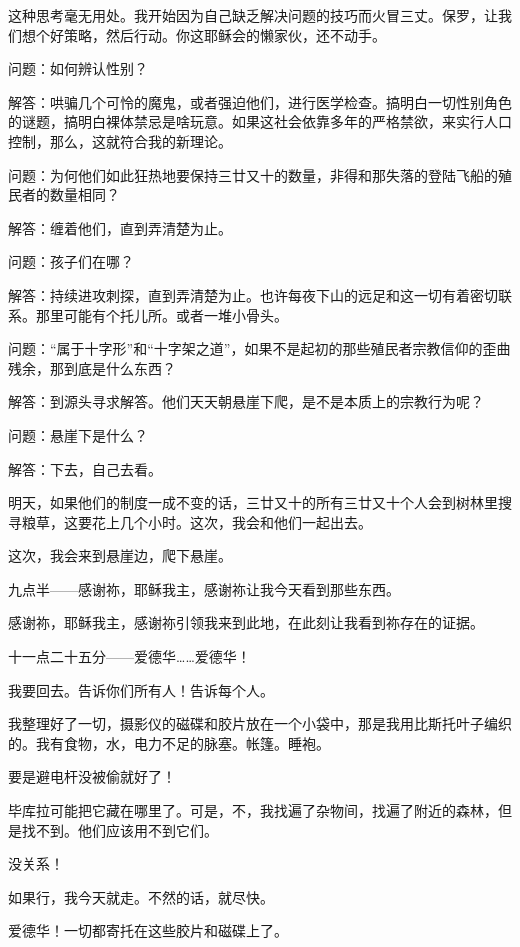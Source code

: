 \documentclass[AutoFakeBold=true]{book}
\begin{document}
这种思考毫无用处。我开始因为自己缺乏解决问题的技巧而火冒三丈。保罗，让我们想个好策略，然后行动。你这耶稣会的懒家伙，还不动手。

{\heiti 问题：}如何辨认性别？

{\heiti 解答：}哄骗几个可怜的魔鬼，或者强迫他们，进行医学检查。搞明白一切性别角色的谜题，搞明白裸体禁忌是啥玩意。如果这社会依靠多年的严格禁欲，来实行人口控制，那么，这就符合我的新理论。

{\heiti 问题：}为何他们如此狂热地要保持三廿又十的数量，非得和那失落的登陆飞船的殖民者的数量相同？

{\heiti 解答：}缠着他们，直到弄清楚为止。

{\heiti 问题：}孩子们在哪？

{\heiti 解答：}持续进攻刺探，直到弄清楚为止。也许每夜下山的远足和这一切有着密切联系。那里可能有个托儿所。或者一堆小骨头。

{\heiti 问题：}``属于十字形''和``十字架之道''，如果不是起初的那些殖民者宗教信仰的歪曲残余，那到底是什么东西？

{\heiti 解答：}到源头寻求解答。他们天天朝悬崖下爬，是不是本质上的宗教行为呢？

{\heiti 问题：}悬崖下是什么？

{\heiti 解答：}下去，自己去看。

明天，如果他们的制度一成不变的话，三廿又十的所有三廿又十个人会到树林里搜寻粮草，这要花上几个小时。这次，我会和他们一起出去。

这次，我会来到悬崖边，爬下悬崖。

\vspace*{1em}{\kaishu 第一百零五日：}

九点半——感谢祢，耶稣我主，感谢祢让我今天看到那些东西。

感谢祢，耶稣我主，感谢祢引领我来到此地，在此刻让我看到祢存在的证据。

十一点二十五分——爱德华……爱德华！

我要回去。告诉你们所有人！告诉每个人。

我整理好了一切，摄影仪的磁碟和胶片放在一个小袋中，那是我用比斯托叶子编织的。我有食物，水，电力不足的脉塞。帐篷。睡袍。

要是避电杆没被偷就好了！

毕库拉可能把它藏在哪里了。可是，不，我找遍了杂物间，找遍了附近的森林，但是找不到。他们应该用不到它们。

没关系！

如果行，我今天就走。不然的话，就尽快。

爱德华！一切都寄托在这些胶片和磁碟上了。
\end{document}
